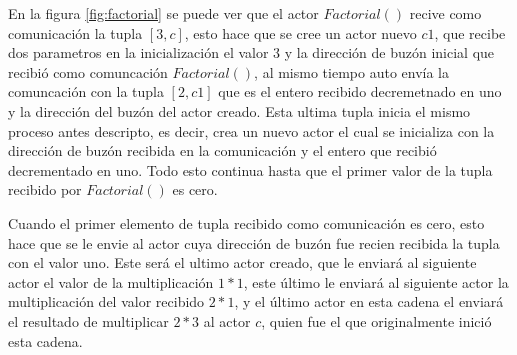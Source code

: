 En la figura \ref{fig:factorial} se puede ver que el actor $Factorial()$ recive como comunicación la tupla $[3,c]$, esto hace que se cree un actor nuevo $c1$, que recibe dos parametros en la inicialización el valor $3$ y la dirección de buzón inicial que recibió como comuncación $Factorial()$, al mismo tiempo auto envía la comuncación con la tupla $[2,c1]$ que es el entero recibido decremetnado en uno y la dirección del buzón del actor creado. Esta ultima tupla inicia el mismo proceso antes descripto, es decir, crea un nuevo actor el cual se inicializa con la dirección de buzón recibida en la comunicación y el entero que recibió decrementado en uno. Todo esto continua hasta que el primer valor de la tupla recibido por $Factorial()$ es cero. 

Cuando el primer elemento de tupla recibido como comunicación es cero, esto hace que se le envie al actor cuya dirección de buzón fue recien recibida la tupla con el valor uno. Este será el ultimo actor creado, que le enviará al siguiente actor el valor de la multiplicación $1*1$, este último le enviará al siguiente actor la multiplicación del valor recibido $2*1$, y el último actor en esta cadena el enviará el resultado de multiplicar $2*3$ al actor $c$, quien fue el que originalmente inició esta cadena.


